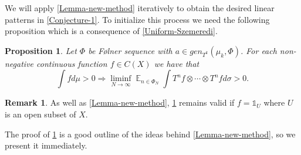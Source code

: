 \documentclass[letter,11pt]{article}
\newtheorem{prop}[theo]{Proposition}
\theoremstyle{definition}
\newtheorem{remark}[theo]{Remark}
\newcommand{\bE}{\mathop{\mathbb{E}}}
\newcommand{\ind}[1]{\mathbb{1}_{#1}}
\begin{document}
We will apply \cref{Lemma-new-method} iteratively to obtain the desired linear patterns in \cref{Conjecture-1}. To initialize this process we need the following proposition which is a consequence of \cref{Uniform-Szemeredi}.
\begin{prop}\label{positive-sigma-measure}
     Let $\Phi$ be F\o lner sequence with $a\in gen_{T^k}(\mu_k,\Phi)$. For each non-negative continuous function $f\in C(X)$ we have that
      \begin{equation*}
        \int f d\mu >0 \Rightarrow
   \liminf_{N\to\infty} \bE_{n\in \Phi_N}\int  T^{n}f \otimes \cdots \otimes T^n f  d\sigma >0.
    \end{equation*}
\end{prop}
\begin{remark}\label{useful-remark-ii}
As well as \cref{Lemma-new-method}, \cref{positive-sigma-measure} remains valid if $f=\ind{U}$ where $U$ is an open subset of $X$.
\end{remark}
The proof of \cref{positive-sigma-measure} is a good outline of the ideas behind \cref{Lemma-new-method}, so we present it immediately. 
\end{document}
